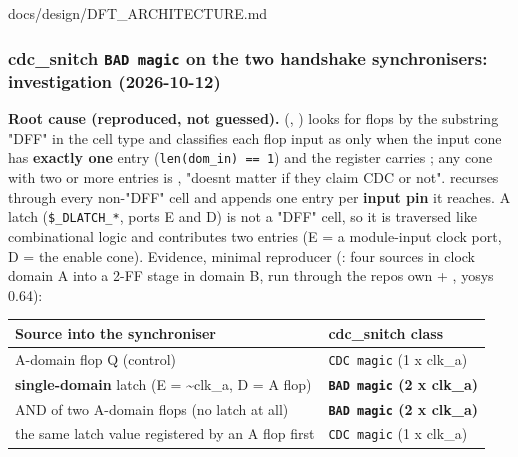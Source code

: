 \begin{relocated}{docs/design/DFT_ARCHITECTURE.md}
\subsubsection{\texorpdfstring{cdc\_\allowbreak{}snitch
\texttt{BAD\ magic} on the two handshake synchronisers: investigation
(2026-10-12)}{cdc\_snitch  on the two handshake synchronisers: investigation (2026-10-12)}}\label{tm:ch:dft-architecture:1592-cdc-snitch-bad-magic-on-the-two-handshake-synchronisers-investigation-2026-10-12}

\textbf{Root cause (reproduced, not guessed).} 
(, ) looks for flops by the substring
"DFF" in the cell type and classifies each flop input as  only
when the input cone has \textbf{exactly one} entry
(\texttt{len(dom\_\allowbreak{}in)\ =\allowbreak{}=\allowbreak{}\ 1})
and the register carries ; any cone with two or more
entries is , "doesn\textquotesingle t matter if they claim CDC
or not".  recurses through every non-"DFF" cell and
appends one entry per \textbf{input pin} it reaches. A latch
(\texttt{\$\_\allowbreak{}DLATCH\_\allowbreak{}*}, ports E and D) is not
a "DFF" cell, so it is traversed like combinational logic and
contributes two entries (E = a module-input clock port, D = the enable
cone). Evidence, minimal reproducer (: four sources
in clock domain A into a  2-FF stage in domain B, run
through the repo\textquotesingle s own  +
, yosys 0.64):

{
\begin{longtable}[]{@{}
  >{\raggedright\arraybackslash}p{}
  >{\raggedright\arraybackslash}p{}@{}}
\toprule\noalign{}
\begin{minipage}[b]{\linewidth}\raggedright
Source into the synchroniser
\end{minipage} & \begin{minipage}[b]{\linewidth}\raggedright
cdc\_\allowbreak{}snitch class
\end{minipage} \\
\midrule\noalign{}
\endhead
\bottomrule\noalign{}
\endlastfoot
A-domain flop Q (control) & \texttt{CDC\ magic} (1 x clk\_a) \\
\textbf{single-domain} latch (E = \textasciitilde clk\_a, D = A flop) &
\textbf{\texttt{BAD\ magic} (2 x clk\_a)} \\
AND of two A-domain flops (no latch at all) &
\textbf{\texttt{BAD\ magic} (2 x clk\_a)} \\
the same latch value registered by an A flop first & \texttt{CDC\ magic}
(1 x clk\_a) \\
\end{longtable}
}


\end{relocated}

